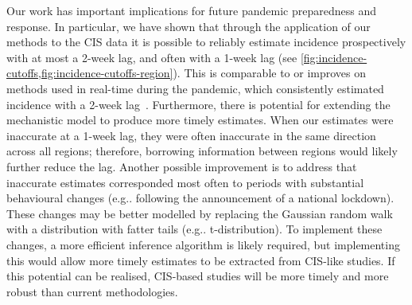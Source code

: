 \documentclass[9pt,twocolumn,twoside]{pnas-new}
\makeatletter
\DeclareRobustCommand\onedot{\futurelet\@let@token\@onedot}
\def\@onedot{\ifx\@let@token.\else.\null\fi\xspace}
\def\eg{e.g\onedot} \def\Eg{{E.g}\onedot}
\makeatother
\begin{document}
Our work has important implications for future pandemic preparedness and response. 
In particular, we have shown that through the application of our methods to the CIS data it is possible to reliably estimate incidence prospectively with at most a 2-week lag,  and often with a 1-week lag (see \cref{fig:incidence-cutoffs,fig:incidence-cutoffs-region}).
This is comparable to or improves on methods used in real-time during the pandemic, which consistently estimated incidence with a 2-week lag~\citep{spimConsensus,richardsModellingUKReport}.
Furthermore, there is potential for extending the mechanistic model to produce more timely estimates.
When our estimates were inaccurate at a 1-week lag, they were often inaccurate in the same direction across all regions; therefore, borrowing information between regions would likely further reduce the lag.
Another possible improvement is to address that inaccurate estimates corresponded most often to periods with substantial behavioural changes (\eg following the announcement of a national lockdown).
These changes may be better modelled by replacing the Gaussian random walk with a distribution with fatter tails (\eg t-distribution).
To implement these changes, a more efficient inference algorithm is likely required, but implementing this would allow more timely estimates to be extracted from CIS-like studies.
If this potential can be realised, CIS-based studies will be more timely and more robust than current methodologies.
\end{document}
